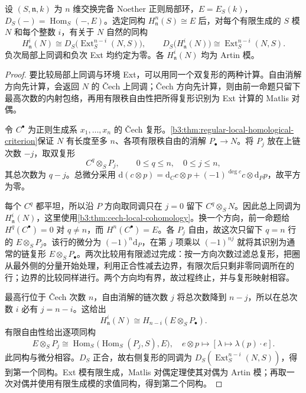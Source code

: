 \begin{theorem}\label{b3:thm:regular-local-duality}
	设 \((S,\mathfrak n,k)\) 为 \(n\) 维交换完备 Noether 正则局部环，\(E=E_S(k)\)，\(D_S(-)=\operatorname{Hom}_S(-,E)\)。选定同构 \(H^n_{\mathfrak n}(S)\cong E\) 后，对每个有限生成的 \(S\) 模 \(N\) 和每个整数 \(i\)，有关于 \(N\) 自然的同构
	\[
		H^i_{\mathfrak n}(N) \cong D_S\bigl(\operatorname{Ext}_S^{n-i}(N,S)\bigr), \qquad D_S\bigl(H^i_{\mathfrak n}(N)\bigr) \cong\operatorname{Ext}_S^{n-i}(N,S).
	\]
	负次局部上同调和负次 Ext 均约定为零。各 \(H^i_{\mathfrak n}(N)\) 均为 Artin 模。
\end{theorem}
\begin{proof}
	要比较局部上同调与环境 Ext，可以用同一个双复形的两种计算。自由消解方向先计算，会返回 \(N\) 的 Čech 上同调；Čech 方向先计算，则由前一命题只留下最高次数的内射包络，再用有限秩自由性把所得复形识别为 Ext 计算的 Matlis 对偶。

	令 \(C^\bullet\) 为正则生成系 \(x_1,\ldots,x_n\) 的 Čech 复形。\cref{b3:thm:regular-local-homological-criterion}保证 \(N\) 有长度至多 \(n\)、各项有限秩自由的消解 \(P_\bullet\rightarrow N\)。将 \(P_j\) 放在上链次数 \(-j\)，取双复形
	\[
		C^q\otimes_SP_j,\qquad 0\le q\le n,\quad 0\le j\le n,
	\]
	其总次数为 \(q-j\)。总微分采用 \(\mathrm{d}(c\otimes p)=\mathrm{d}_Cc\otimes p+(-1)^{\deg c}c\otimes \mathrm{d}_Pp\)，故平方为零。

	每个 \(C^q\) 都平坦，所以沿 \(P\) 方向取同调只在 \(j=0\) 留下 \(C^q\otimes_SN\)。因此总上同调为 \(H^i_{\mathfrak n}(N)\)，这里使用\cref{b3:thm:cech-local-cohomology}。换一个方向，前一命题给 \(H^q(C^\bullet)=0\) 对 \(q\ne n\)，而 \(H^n(C^\bullet)=E\)。各 \(P_j\) 自由，故这次只留下 \(q=n\) 行的 \(E\otimes_SP_j\)。该行的微分为 \((-1)^n\mathrm{d}_P\)，在第 \(j\) 项乘以 \((-1)^{nj}\) 就将其识别为通常的链复形 \(E\otimes_SP_\bullet\)。两次比较用有限滤过完成：按一方向次数过滤总复形，把圈从最外侧的分量开始处理，利用正合性减去边界，有限次后只剩非零同调所在的行；边界的比较同样进行。两个方向均有界，故过程终止，并与复形映射相容。

	最高行位于 Čech 次数 \(n\)，自由消解的链次数 \(j\) 将总次数降到 \(n-j\)，所以在总次数 \(i\) 必有 \(j=n-i\)。这给出
	\[
		H^i_{\mathfrak n}(N) \cong H_{n-i}(E\otimes_SP_\bullet).
	\]
	有限自由性给出逐项同构
	\[
		E\otimes_SP_j \cong\operatorname{Hom}_S\bigl(\operatorname{Hom}_S(P_j,S),E\bigr), \quad e\otimes p\longmapsto[\lambda\mapsto\lambda(p)\cdot e].
	\]
	此同构与微分相容。\(D_S\) 正合，故右侧复形的同调为 \(D_S(\operatorname{Ext}_S^{n-i}(N,S))\)，得到第一个同构。Ext 模有限生成，Matlis 对偶定理使其对偶为 Artin 模；再取一次对偶并使用有限生成模的求值同构，得到第二个同构。
\end{proof}

